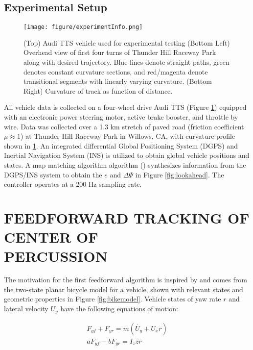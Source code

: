 \documentclass[twocolumn,10pt]{asme2e}
\begin{document}
\subsection{Experimental Setup}

\begin{figure}
\centering
\texttt{[image: figure/experimentInfo.png]}
\caption{(Top) Audi TTS vehicle used for experimental testing (Bottom Left) Overhead view of first four turns of Thunder Hill Raceway Park along with desired trajectory. Blue lines denote straight paths, green denotes constant curvature sections, and red/magenta denote transitional segments with linearly varying curvature.
(Bottom Right) Curvature of track as function of distance. }
\label{fig:shelleyPic}
\end{figure}

All vehicle data is collected on a four-wheel drive Audi TTS (Figure \ref{fig:shelleyPic}) equipped with an electronic power steering motor,
active brake booster, and throttle by wire. Data was collected over a 1.3 km stretch of paved road (friction coefficient $\mu \approx 1$) at Thunder Hill Raceway Park in Willows, CA, with curvature profile shown
in \ref{fig:shelleyPic}. An integrated differential Global Positioning System (DGPS) and Inertial Navigation System (INS) is utilized to obtain global vehicle positions and states.  A map matching algorithm
algorithm (\cite{rosseter}) synthesizes information from the DGPS/INS system to obtain the $e$ and $\Delta\Psi$ in Figure \ref{fig:lookahead}. The controller operates at a 200 Hz sampling rate.




\section{FEEDFORWARD TRACKING OF CENTER OF \\ PERCUSSION} \label{cop}

The motivation for the first feedforward algorithm is inspired by \cite{mickcop} and comes from the two-state planar bicycle model for a vehicle, shown with relevant states and geometric properties in Figure \ref{fig:bikemodel}. Vehicle states of yaw rate $r$ and lateral velocity $U_y$ have the following equations of motion:

\begin{equation}
\begin{aligned}
F_{yf} + F_{yr} = m(\dot{U_y} + U_xr)\\
aF_{yf} - bF_{yr} = I_zz\dot{r}
\label{eqn:eom}
\end{aligned}
\end{equation}
\end{document}
